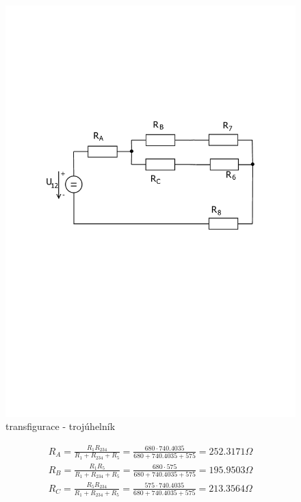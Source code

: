 	\begin{figure}[H]
		\vspace{-1.1cm}
		\center\includegraphics[width=0.6\linewidth]{obr/1_4}
		\caption{transfigurace - trojúhelník}
	\end{figure}
	\begin{gather*}
		R_A = \frac{R_1  R_{234}}{R_1 + R_{234} + R_5} = \frac{680 \cdot 740.4035}{680 +  740.4035 + 575} = 252.3171 \Omega \\
		R_B = \frac{R_1  R_5}{R_1 + R_{234} + R_5} = \frac{680 \cdot 575}{680 +  740.4035 + 575} = 195.9503 \Omega \\
		R_C = \frac{R_5  R_{234}}{R_1 + R_{234} + R_5} = \frac{575 \cdot 740.4035}{680 +  740.4035 + 575} = 213.3564 \Omega 
	\end{gather*}

